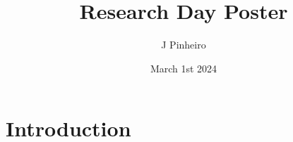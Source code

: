 \documentclass[final,hyperref={pdfpagelabels=false}]{beamer}
\title{Research Day Poster}
\author{J Pinheiro}
\date{March 1st 2024}
\begin{document}
\maketitle

\section{Introduction}
\end{document}
